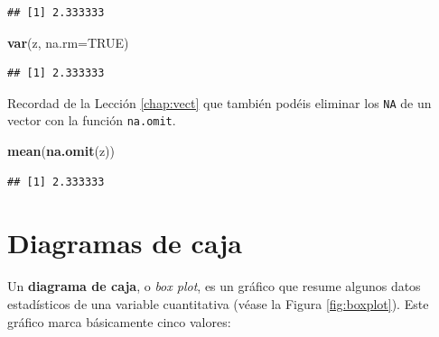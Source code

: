 \documentclass[]{book}
\newenvironment{Shaded}{\begin{snugshade}}{\end{snugshade}}
\newcommand{\DataTypeTok}[1]{\textcolor[rgb]{0.13,0.29,0.53}{#1}}
\newcommand{\KeywordTok}[1]{\textcolor[rgb]{0.13,0.29,0.53}{\textbf{#1}}}
\newcommand{\NormalTok}[1]{#1}
\newcommand{\OtherTok}[1]{\textcolor[rgb]{0.56,0.35,0.01}{#1}}
\theoremstyle{definition}
\theoremstyle{definition}
\theoremstyle{definition}
\theoremstyle{remark}
\begin{document}
\begin{verbatim}
## [1] 2.333333
\end{verbatim}

\begin{Shaded}
\begin{Highlighting}[]
\KeywordTok{var}\NormalTok{(z, }\DataTypeTok{na.rm=}\OtherTok{TRUE}\NormalTok{)}
\end{Highlighting}
\end{Shaded}

\begin{verbatim}
## [1] 2.333333
\end{verbatim}

Recordad de la Lección \ref{chap:vect} que también podéis eliminar los \texttt{NA} de un vector con la función \texttt{na.omit}.

\begin{Shaded}
\begin{Highlighting}[]
\KeywordTok{mean}\NormalTok{(}\KeywordTok{na.omit}\NormalTok{(z))}
\end{Highlighting}
\end{Shaded}

\begin{verbatim}
## [1] 2.333333
\end{verbatim}

\hypertarget{diagramas-de-caja}{%
\section{Diagramas de caja}\label{diagramas-de-caja}}

Un \textbf{diagrama de caja}, o \emph{box plot}, es un gráfico que resume algunos datos estadísticos de una variable cuantitativa (véase la Figura \ref{fig:boxplot}). Este gráfico marca básicamente cinco valores:
\end{document}
